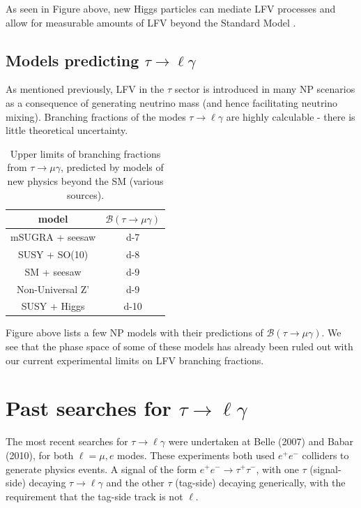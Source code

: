 \documentclass[12pt]{thesis}  %
\newcommand{\br}{\mathcal{B}}
\newcommand{\tmg}{\tau\to\mu\gamma}
\newcommand{\tlg}{\tau\to\ell\gamma}
\begin{document}
As seen in Figure above, new Higgs particles can mediate LFV processes and allow for measurable amounts of LFV beyond the Standard Model \cite{Dorsner:2015}.


\subsection{Models predicting $\tlg$}

As mentioned previously, LFV in the $\tau$ sector is introduced in many NP scenarios as a consequence of generating neutrino mass (and hence facilitating neutrino mixing). Branching fractions of the modes $\tlg$ are highly calculable - there is little theoretical uncertainty.

\begin{table}[h]
\centering
\begin{tabular}{cc}
\hline \textbf{model} & $\mathcal{B}(\tau\to\mu\gamma)$ \\ \hline
mSUGRA + seesaw & \num{d-7} \\
SUSY + SO(10) & \num{d-8} \\
SM + seesaw & \num{d-9} \\
Non-Universal Z' & \num{d-9} \\
SUSY + Higgs & \num{d-10} \\ \hline
\end{tabular}
\caption[]%
{{\small Upper limits of branching fractions from $\tmg$, predicted by models of new physics beyond the SM (various sources)\cite{Ohshima:2007}.}}
\label{tab:bounds by NP}
\end{table}

Figure above lists a few NP models with their predictions of $\br(\tmg)$. We see that the phase space of some of these models has already been ruled out with our current experimental limits on LFV branching fractions.


\section{Past searches for $\tlg$}

The most recent searches for $\tlg$ were undertaken at Belle (2007) and Babar (2010), for both $\ell=\mu,e$ modes. These experiments both used $e^+ e^-$ colliders to generate physics events. A signal of the form $e^+ e^-\to \tau^+ \tau^-$, with one $\tau$ (signal-side) decaying $\tau\to \ell \gamma$ and the other $\tau$ (tag-side) decaying generically, with the requirement that the tag-side track is not $\ell$.
\end{document}
